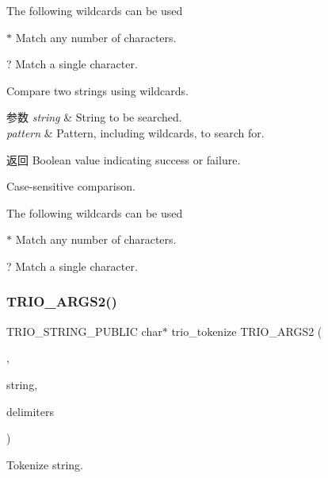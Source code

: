 The following wildcards can be used \begin{DoxyItemize}
\item {\ttfamily $\ast$} Match any number of characters. \item {\ttfamily }? Match a single character.\end{DoxyItemize}
Compare two strings using wildcards.


\begin{DoxyParams}{参数}
{\em string} & String to be searched. \\
\hline
{\em pattern} & Pattern, including wildcards, to search for. \\
\hline
\end{DoxyParams}
\begin{DoxyReturn}{返回}
Boolean value indicating success or failure.
\end{DoxyReturn}
Case-\/sensitive comparison.

The following wildcards can be used \begin{DoxyItemize}
\item {\ttfamily $\ast$} Match any number of characters. \item {\ttfamily }? Match a single character. \end{DoxyItemize}
\mbox{\label{group___static_strings_ga8bf1d32e8a87f8c13ee53d3c91498176}} 
\subsubsection{\texorpdfstring{T\+R\+I\+O\+\_\+\+A\+R\+G\+S2()}{TRIO\_ARGS2()}\hspace{0.1cm}{\footnotesize\ttfamily [8/9]}}
{\footnotesize\ttfamily T\+R\+I\+O\+\_\+\+S\+T\+R\+I\+N\+G\+\_\+\+P\+U\+B\+L\+IC char$\ast$ trio\+\_\+tokenize T\+R\+I\+O\+\_\+\+A\+R\+G\+S2 (\begin{DoxyParamCaption}\item[{(\hyperlink{structstring}{string}, delimiters)}]{,  }\item[{char $\ast$}]{string,  }\item[{T\+R\+I\+O\+\_\+\+C\+O\+N\+ST char $\ast$}]{delimiters }\end{DoxyParamCaption})}

Tokenize string.


